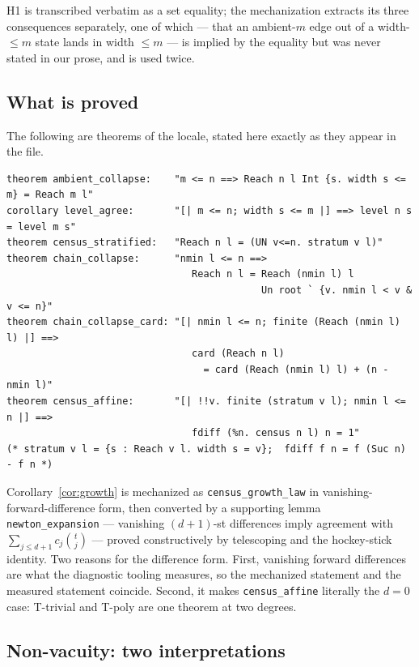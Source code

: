 \documentclass[11pt,a4paper]{article}
\theoremstyle{plain}
\theoremstyle{definition}
\theoremstyle{remark}
\begin{document}
H1 is transcribed verbatim as a set equality; the mechanization extracts its
three consequences separately, one of which --- that an ambient-$m$ edge out of
a width-$\le m$ state lands in width $\le m$ --- is implied by the equality but
was never stated in our prose, and is used twice.

\subsection{What is proved}

The following are theorems of the locale, stated here exactly as they appear in
the file.

\begin{lstlisting}
theorem ambient_collapse:    "m <= n ==> Reach n l Int {s. width s <= m} = Reach m l"
corollary level_agree:       "[| m <= n; width s <= m |] ==> level n s = level m s"
theorem census_stratified:   "Reach n l = (UN v<=n. stratum v l)"
theorem chain_collapse:      "nmin l <= n ==>
                                Reach n l = Reach (nmin l) l
                                            Un root ` {v. nmin l < v & v <= n}"
theorem chain_collapse_card: "[| nmin l <= n; finite (Reach (nmin l) l) |] ==>
                                card (Reach n l)
                                  = card (Reach (nmin l) l) + (n - nmin l)"
theorem census_affine:       "[| !!v. finite (stratum v l); nmin l <= n |] ==>
                                fdiff (%n. census n l) n = 1"
(* stratum v l = {s : Reach v l. width s = v};  fdiff f n = f (Suc n) - f n *)
\end{lstlisting}

Corollary~\ref{cor:growth} is mechanized as \texttt{census\_growth\_law} in
vanishing-forward-difference form, then converted by a supporting lemma
\texttt{newton\_expansion} --- vanishing $(d{+}1)$-st differences imply
agreement with $\sum_{j \le d+1} c_j \binom{t}{j}$ --- proved constructively by
telescoping and the hockey-stick identity. Two reasons for the difference form.
First, vanishing forward differences are what the diagnostic tooling measures,
so the mechanized statement and the measured statement coincide. Second, it
makes \texttt{census\_affine} literally the $d=0$ case: T-trivial and T-poly
are one theorem at two degrees.

\subsection{Non-vacuity: two interpretations}
\end{document}
